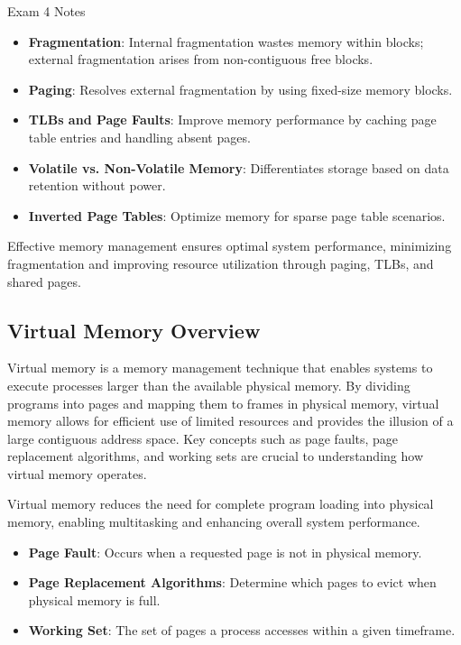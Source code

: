 \begin{examnotes}{Exam 4 Notes}
    \begin{highlight}
        \begin{itemize}
            \item \textbf{Fragmentation}: Internal fragmentation wastes memory within blocks; external fragmentation arises from non-contiguous free blocks.
            \item \textbf{Paging}: Resolves external fragmentation by using fixed-size memory blocks.
            \item \textbf{TLBs and Page Faults}: Improve memory performance by caching page table entries and handling absent pages.
            \item \textbf{Volatile vs. Non-Volatile Memory}: Differentiates storage based on data retention without power.
            \item \textbf{Inverted Page Tables}: Optimize memory for sparse page table scenarios.
        \end{itemize}
    \end{highlight}
    
    Effective memory management ensures optimal system performance, minimizing fragmentation and improving resource utilization through paging, TLBs, and shared pages.

    \subsection*{Virtual Memory Overview}

    Virtual memory is a memory management technique that enables systems to execute processes larger than the available physical memory. By dividing programs into pages and mapping them to frames in physical 
    memory, virtual memory allows for efficient use of limited resources and provides the illusion of a large contiguous address space. Key concepts such as page faults, page replacement algorithms, and working 
    sets are crucial to understanding how virtual memory operates.
    
    Virtual memory reduces the need for complete program loading into physical memory, enabling multitasking and enhancing overall system performance.
    
    \begin{highlight}
        \begin{itemize}
            \item \textbf{Page Fault}: Occurs when a requested page is not in physical memory.
            \item \textbf{Page Replacement Algorithms}: Determine which pages to evict when physical memory is full.
            \item \textbf{Working Set}: The set of pages a process accesses within a given timeframe.
        \end{itemize}
    \end{highlight}
    

\end{examnotes}
